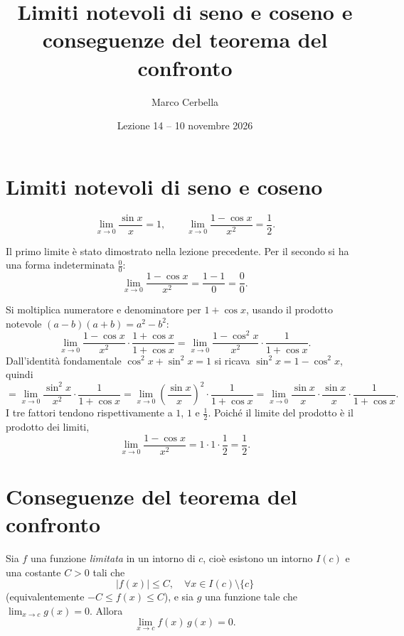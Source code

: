 \documentclass[11pt,a4paper]{article}
\title{Limiti notevoli di seno e coseno e conseguenze del teorema del confronto}
\author{Marco Cerbella}
\date{Lezione 14 -- 10 novembre 2026}
\begin{document}
\maketitle

\section{Limiti notevoli di seno e coseno}

\begin{teorema}
\[
  \lim_{x\to 0}\frac{\sin x}{x} = 1, \qquad \lim_{x\to 0}\frac{1 - \cos x}{x^2} = \frac{1}{2}.
\]
\end{teorema}

Il primo limite è stato dimostrato nella lezione precedente. Per il secondo si ha una forma indeterminata $\frac{0}{0}$:
\[
  \lim_{x\to 0}\frac{1 - \cos x}{x^2} = \frac{1 - 1}{0} = \frac{0}{0}.
\]

\begin{esempio}
Si moltiplica numeratore e denominatore per $1 + \cos x$, usando il prodotto notevole $(a - b)(a + b) = a^2 - b^2$:
\[
  \lim_{x\to 0}\frac{1 - \cos x}{x^2}\cdot\frac{1 + \cos x}{1 + \cos x} = \lim_{x\to 0}\frac{1 - \cos^2 x}{x^2}\cdot\frac{1}{1 + \cos x}.
\]
Dall'identità fondamentale $\cos^2 x + \sin^2 x = 1$ si ricava $\sin^2 x = 1 - \cos^2 x$, quindi
\[
  = \lim_{x\to 0}\frac{\sin^2 x}{x^2}\cdot\frac{1}{1 + \cos x} = \lim_{x\to 0}\left(\frac{\sin x}{x}\right)^{2}\cdot\frac{1}{1 + \cos x}
  = \lim_{x\to 0}\frac{\sin x}{x}\cdot\frac{\sin x}{x}\cdot\frac{1}{1 + \cos x}.
\]
I tre fattori tendono rispettivamente a $1$, $1$ e $\frac{1}{2}$. Poiché il limite del prodotto è il prodotto dei limiti,
\[
  \lim_{x\to 0}\frac{1 - \cos x}{x^2} = 1\cdot 1\cdot\frac{1}{2} = \frac{1}{2}.
\]
\end{esempio}

\section{Conseguenze del teorema del confronto}

\begin{teorema}
Sia $f$ una funzione \emph{limitata} in un intorno di $c$, cioè esistono un intorno $I(c)$ e una costante $C > 0$ tali che
\[
  |f(x)| \le C, \quad \forall x \in I(c)\setminus\{c\}
\]
(equivalentemente $-C \le f(x) \le C$), e sia $g$ una funzione tale che $\displaystyle\lim_{x\to c} g(x) = 0$. Allora
\[
  \lim_{x\to c} f(x)\,g(x) = 0.
\]
\end{teorema}
\end{document}
